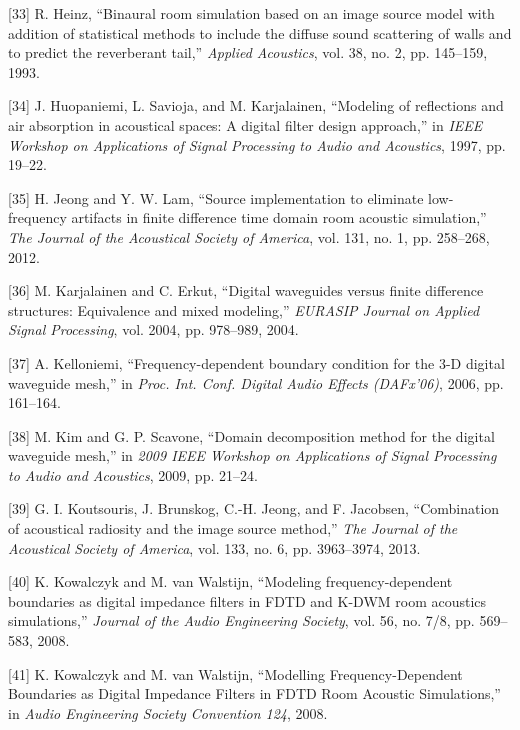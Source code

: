 \documentclass[]{scrreprt}
\begin{document}
\hypertarget{ref-heinzux5fbinauralux5f1993}{}
{[}33{]} R. Heinz, ``Binaural room simulation based on an image source
model with addition of statistical methods to include the diffuse sound
scattering of walls and to predict the reverberant tail,'' \emph{Applied
Acoustics}, vol. 38, no. 2, pp. 145--159, 1993.

\hypertarget{ref-huopaniemiux5fmodelingux5f1997}{}
{[}34{]} J. Huopaniemi, L. Savioja, and M. Karjalainen, ``Modeling of
reflections and air absorption in acoustical spaces: A digital filter
design approach,'' in \emph{IEEE Workshop on Applications of Signal
Processing to Audio and Acoustics}, 1997, pp. 19--22.

\hypertarget{ref-jeongux5fsourceux5f2012}{}
{[}35{]} H. Jeong and Y. W. Lam, ``Source implementation to eliminate
low-frequency artifacts in finite difference time domain room acoustic
simulation,'' \emph{The Journal of the Acoustical Society of America},
vol. 131, no. 1, pp. 258--268, 2012.

\hypertarget{ref-karjalainenux5fdigitalux5f2004}{}
{[}36{]} M. Karjalainen and C. Erkut, ``Digital waveguides versus finite
difference structures: Equivalence and mixed modeling,'' \emph{EURASIP
Journal on Applied Signal Processing}, vol. 2004, pp. 978--989, 2004.

\hypertarget{ref-kelloniemiux5ffrequency-dependentux5f2006}{}
{[}37{]} A. Kelloniemi, ``Frequency-dependent boundary condition for the
3-D digital waveguide mesh,'' in \emph{Proc. Int. Conf. Digital Audio
Effects (DAFx'06)}, 2006, pp. 161--164.

\hypertarget{ref-kimux5fdomainux5f2009}{}
{[}38{]} M. Kim and G. P. Scavone, ``Domain decomposition method for the
digital waveguide mesh,'' in \emph{2009 IEEE Workshop on Applications of
Signal Processing to Audio and Acoustics}, 2009, pp. 21--24.

\hypertarget{ref-koutsourisux5fcombinationux5f2013}{}
{[}39{]} G. I. Koutsouris, J. Brunskog, C.-H. Jeong, and F. Jacobsen,
``Combination of acoustical radiosity and the image source method,''
\emph{The Journal of the Acoustical Society of America}, vol. 133, no.
6, pp. 3963--3974, 2013.

\hypertarget{ref-kowalczykux5fmodelingux5f2008}{}
{[}40{]} K. Kowalczyk and M. van Walstijn, ``Modeling
frequency-dependent boundaries as digital impedance filters in FDTD and
K-DWM room acoustics simulations,'' \emph{Journal of the Audio
Engineering Society}, vol. 56, no. 7/8, pp. 569--583, 2008.

\hypertarget{ref-kowalczykux5fmodellingux5f2008}{}
{[}41{]} K. Kowalczyk and M. van Walstijn, ``Modelling
Frequency-Dependent Boundaries as Digital Impedance Filters in FDTD Room
Acoustic Simulations,'' in \emph{Audio Engineering Society Convention
124}, 2008.
\end{document}
